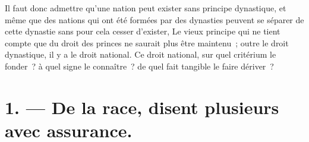 \documentclass[french,twoside]{book} %
\begin{document}
Il faut donc admettre qu’une nation peut exister sans principe dynastique, et même que des nations qui ont été formées par des dynasties peuvent se séparer de cette dynastie sans pour cela cesser d’exister, Le vieux principe qui ne tient compte que du droit des princes ne saurait plus être maintenu ; outre le droit dynastique, il y a le droit national. Ce droit national, sur quel critérium le fonder ? à quel signe le connaître ? de quel fait tangible le faire dériver ?\par

\section[{1. — De la race, disent plusieurs avec assurance.}]{1. — De la race, disent plusieurs avec assurance.}
\end{document}
